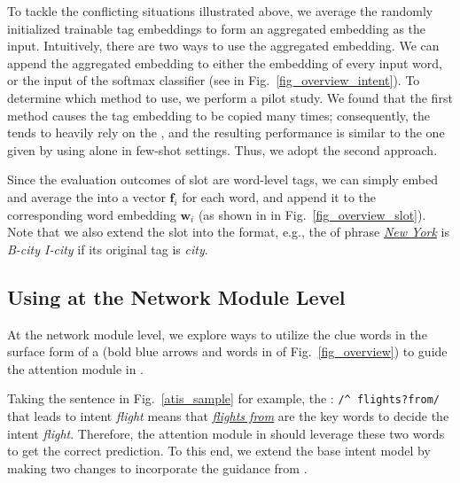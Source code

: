 To tackle the conflicting situations illustrated above, we average the randomly initialized trainable tag embeddings to form an aggregated embedding as the \NN input.
Intuitively, there are two ways to use the aggregated embedding. We can  append the aggregated embedding to either the embedding of every
input word, or the input of the softmax classifier (see  in Fig.~\ref{fig_overview_intent}). To determine which method to use,
we perform a pilot study. We found that the first method causes the tag embedding to be copied many times; consequently, the \NN tends to
heavily rely on the \REtags, and the resulting performance is similar to the one given by using \REs alone in few-shot settings. Thus, we
adopt the second approach.

 Since the evaluation outcomes of slot \REs are word-level tags,
we can simply embed and average the \REtags into a vector $\textbf{f}_i$ for each word, and append it
to the corresponding word embedding $\textbf{w}_i$ (as shown in  in Fig.~\ref{fig_overview_slot}).
Note that we also extend the slot \REtags into the \BIO format, e.g., the \REtag of phrase \textsl{\underline{New York}} is \emph{B-city
I-city} if its original tag is \emph{city}.

\subsection{Using \REs at the Network Module Level}
\label{interact_with_module} At the network module level, we explore ways to utilize the clue words in the surface form of a \RE (bold blue arrows and
words in  of Fig.~\ref{fig_overview}) to guide the attention module in \NNs.


 Taking the sentence in Fig.~\ref{atis_sample} for example, the \RE: {\small\texttt{/\textasciicircum
flights?\:from/} } that leads to intent \emph{flight} means that \textsl{\underline{flights from}} are the key words to decide the intent
\emph{flight}. Therefore, the attention module in \NNs should leverage these two words to get the correct prediction. To this end, we
extend the base intent model by making two changes to incorporate the guidance from \REs.

